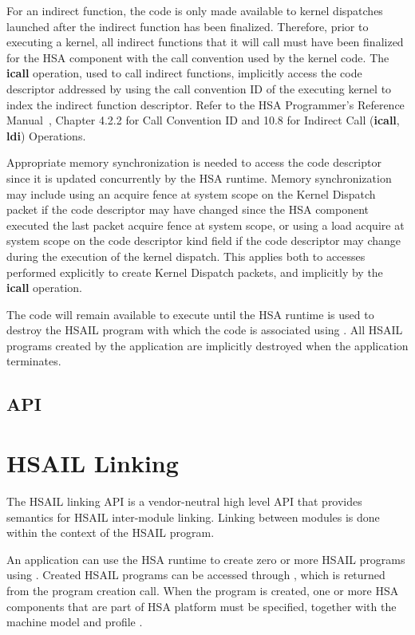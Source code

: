 \documentclass[final,oneside]{book}
\newcommand{\reffun}[1]{\textbf{#1}}
\newcommand{\refhsl}[1]{\reffun{#1}}
\begin{document}
For an indirect function, the code is only made available to kernel dispatches
launched after the indirect function has been finalized. Therefore, prior to
executing a kernel, all indirect functions that it will call must have been
finalized for the HSA component with the call convention used by the kernel
code. The \refhsl{icall} operation, used to call indirect functions, implicitly
access the code descriptor addressed by using the call convention ID of the
executing kernel to index the indirect function descriptor.  Refer to the HSA
Programmer's Reference Manual~\cite{prm}, Chapter 4.2.2 for Call Convention ID
and 10.8 for Indirect Call (\refhsl{icall}, \refhsl{ldi}) Operations.

Appropriate memory synchronization is needed to access the code descriptor since
it is updated concurrently by the HSA runtime. Memory synchronization may
include using an acquire fence at system scope on the Kernel Dispatch packet if
the code descriptor may have changed since the HSA component executed the last
packet acquire fence at system scope, or using a load acquire at system scope on
the code descriptor kind field if the code descriptor may change during the
execution of the kernel dispatch. This applies both to accesses performed
explicitly to create Kernel Dispatch packets, and implicitly by the
\refhsl{icall} operation.

The code will remain available to execute until the HSA runtime is used to
destroy the HSAIL program with which the code is associated using
. All HSAIL programs created by the application
are implicitly destroyed when the application terminates.

\subsection{API}


\section{HSAIL Linking}\label{linking}

The HSAIL linking API is a vendor-neutral high level API that provides semantics
for HSAIL inter-module linking. Linking between modules is done within the
context of the HSAIL program.

An application can use the HSA runtime to create zero or more HSAIL programs
using . Created HSAIL programs can be accessed
through , which is returned from the program
creation call.  When the program is created, one or more HSA components
 that are part of HSA platform must be specified, together
with the machine model  and profile
.
\end{document}
